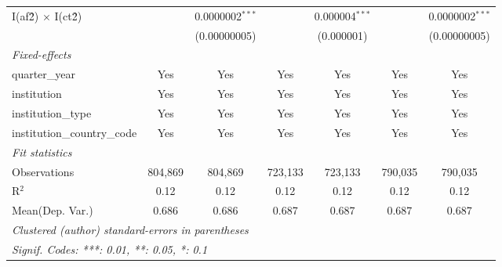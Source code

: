 \begin{tabular}{lcccccc}
   I(af\^2) $\times$ I(ct\^2)         &               & 0.0000002$^{***}$ &               & 0.000004$^{***}$ &               & 0.0000002$^{***}$\\   
                                      &               & (0.00000005)      &               & (0.000001)       &               & (0.00000005)\\   
   \midrule
   \emph{Fixed-effects}\\
   quarter\_year                      & Yes           & Yes               & Yes           & Yes              & Yes           & Yes\\  
   institution                        & Yes           & Yes               & Yes           & Yes              & Yes           & Yes\\  
   institution\_type                  & Yes           & Yes               & Yes           & Yes              & Yes           & Yes\\  
   institution\_country\_code         & Yes           & Yes               & Yes           & Yes              & Yes           & Yes\\  
   \midrule
   \emph{Fit statistics}\\
   Observations                       & 804,869       & 804,869           & 723,133       & 723,133          & 790,035       & 790,035\\  
   R$^2$                              & 0.12          & 0.12              & 0.12          & 0.12             & 0.12          & 0.12\\  
Mean(Dep. Var.) & 0.686 & 0.686 & 0.687 & 0.687 & 0.687 & 0.687 \\
   \midrule \midrule
   \multicolumn{7}{l}{\emph{Clustered (author) standard-errors in parentheses}}\\
   \multicolumn{7}{l}{\emph{Signif. Codes: ***: 0.01, **: 0.05, *: 0.1}}\\
\end{tabular}
\par\endgroup
